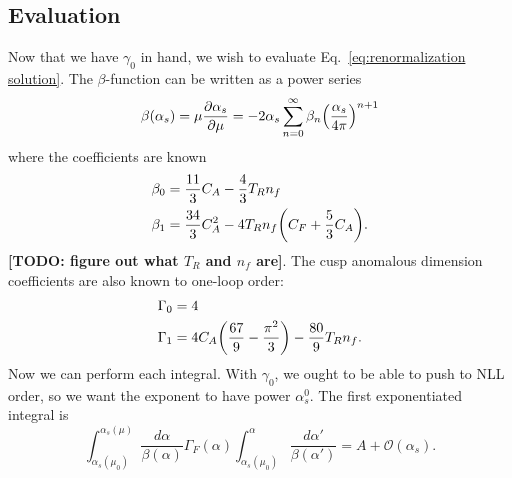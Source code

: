 \documentclass[11pt,twoside,reqno]{amsart}
\theoremstyle{plain}
\theoremstyle{remark}
\theoremstyle{definition}
\theoremstyle{remark}
\theoremstyle{definition}
\theoremstyle{definition}
\newcommand{\cO}{\mathcal{O}}
\begin{document}
\subsection{Evaluation}
	Now that we have $\gamma_0$ in hand, we wish to evaluate Eq.~\ref{eq:renormalization solution}. 
	The $\beta$-function can be written as a power series
	\begin{equation}
		\beta(\alpha_s) = \mu\frac{\partial \alpha_s}{\partial\mu} = -2\alpha_s \sum_{n = 0}^\infty \beta_n \qty(\frac{\alpha_s}{4\pi})^{n+1}
	\end{equation}
	where the coefficients are known \cite{frye_factorization_2016}
	\begin{equation}\label{eq:beta coefficients}
	\begin{aligned}
		\beta_0 &= \frac{11}{3}C_A - \frac{4}{3}T_R n_f \\
		\beta_1 &= \frac{34}{3}C_A^2 - 4T_Rn_f\qty(C_F + \frac{5}{3}C_A).
	\end{aligned}
	\end{equation}
	{\color{red}\textbf{[TODO: figure out what $T_R$ and $n_f$ are]}}. The cusp anomalous dimension coefficients are also known to one-loop order:
	\begin{equation}\label{eq:cusp coefficients}
	\begin{aligned}
		\Gamma_0 &= 4 \\
		\Gamma_1 &= 4C_A\qty(\frac{67}{9} - \frac{\pi^2}{3}) - \frac{80}{9}T_R n_f.
	\end{aligned}
	\end{equation}
	Now we can perform each integral. With $\gamma_0$, we ought to be able to push to NLL order, so we want the exponent to have power $\alpha_s^0$. The first exponentiated integral is
	\begin{equation}
		\int_{\alpha_s(\mu_0)}^{\alpha_s(\mu)} \frac{d\alpha}{\beta(\alpha)}\Gamma_F(\alpha)\int_{\alpha_s(\mu_0)}^\alpha \frac{d\alpha'}{\beta(\alpha')} = A + \cO(\alpha_s).
	\end{equation}
\end{document}

